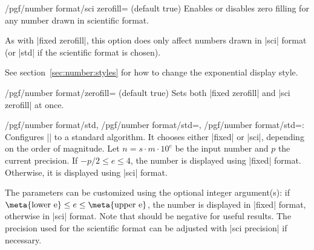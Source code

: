 \begin{key}{/pgf/number format/sci zerofill=  (default true)}
    Enables or disables zero filling for any number drawn in scientific format.
\begin{codeexample}[pre={\begin{lateximage}},post={\end{lateximage}}]
\hspace{1em}
\hspace{1em}
\hspace{1em}
\hspace{1em}
\end{codeexample}
    As with |fixed zerofill|, this option does only affect numbers drawn in
    |sci| format (or |std| if the scientific format is chosen).

    See section~\ref{sec:number:styles} for how to change the exponential
    display style.
\end{key}

\begin{stylekey}{/pgf/number format/zerofill= (default true)}
    Sets both |fixed zerofill| and |sci zerofill| at once.
\end{stylekey}

\begin{keylist}{/pgf/number format/std,%
    /pgf/number format/std=,
    /pgf/number format/std=:%
}
    Configures |\pgfmathprintnumber| to a standard algorithm. It chooses either
    |fixed| or |sci|, depending on the order of magnitude. Let $n=s \cdot m
    \cdot 10^e$ be the input number and $p$ the current precision. If $-p/2 \le
    e \le 4$, the number is displayed using |fixed| format. Otherwise, it is
    displayed using |sci| format.
\begin{codeexample}[pre={\begin{lateximage}},post={\end{lateximage}}]
\hspace{1em}
\hspace{1em}
\hspace{1em}
\hspace{1em}
\end{codeexample}
    The parameters can be customized using the optional integer argument(s): if
    $\text{\meta{lower e}} \le e \le \text{\meta{upper e}}$, the number is
    displayed in |fixed| format, otherwise in |sci| format. Note that
     should be negative for useful results. The precision used
    for the scientific format can be adjusted with |sci precision| if
    necessary.
\end{keylist}

